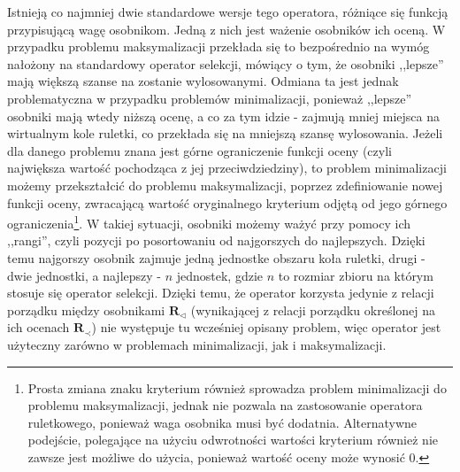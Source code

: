\documentclass[twoside]{iisthesis}
\newcommand{\R}{\mathbf{R}}
\newcommand{\minorityEvalRel}{{\R}_{\prec}}
\newcommand{\minoritySpecimenRel}{{\R}_{\lhd}}
\begin{document}
Istnieją co najmniej dwie standardowe wersje tego operatora, różniące się funkcją przypisującą wagę osobnikom. 
Jedną z nich jest ważenie osobników ich oceną.
W przypadku problemu maksymalizacji przekłada się to bezpośrednio na wymóg nałożony na standardowy operator selekcji, mówiący o tym, że osobniki ,,lepsze'' mają większą szanse na zostanie wylosowanymi.
Odmiana ta jest jednak problematyczna w przypadku problemów minimalizacji, ponieważ ,,lepsze'' osobniki mają wtedy niższą ocenę, a co za tym idzie - zajmują mniej miejsca na wirtualnym kole ruletki, co przekłada się na mniejszą szansę wylosowania.
Jeżeli dla danego problemu znana jest górne ograniczenie funkcji oceny (czyli największa wartość pochodząca z jej przeciwdziedziny), to problem minimalizacji możemy przekształcić do problemu maksymalizacji, poprzez zdefiniowanie nowej funkcji oceny, zwracającą wartość oryginalnego kryterium odjętą od jego górnego ograniczenia\footnote{
	Prosta zmiana znaku kryterium również sprowadza problem minimalizacji do problemu maksymalizacji, jednak nie pozwala na zastosowanie operatora ruletkowego, ponieważ waga osobnika musi być dodatnia. 
	Alternatywne podejście, polegające na użyciu odwrotności wartości kryterium również nie zawsze jest możliwe do użycia, ponieważ wartość oceny może wynosić 0.
}.
W takiej sytuacji, osobniki możemy ważyć przy pomocy ich ,,rangi'', czyli pozycji po posortowaniu od najgorszych do najlepszych.
Dzięki temu najgorszy osobnik zajmuje jedną jednostke obszaru koła ruletki, drugi - dwie jednostki, a najlepszy - $n$ jednostek, gdzie $n$ to rozmiar zbioru na którym stosuje się operator selekcji.
Dzięki temu, że operator korzysta jedynie z relacji porządku między osobnikami $\minoritySpecimenRel$ (wynikającej z relacji porządku określonej na ich ocenach $\minorityEvalRel$) nie występuje tu wcześniej opisany problem, więc operator jest użyteczny zarówno w problemach minimalizacji, jak i maksymalizacji.
\end{document}
